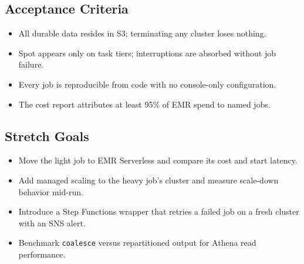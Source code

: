 \subsection*{Acceptance Criteria}
\begin{itemize}
    \item All durable data resides in S3; terminating any cluster loses nothing.
    \item Spot appears only on task tiers; interruptions are absorbed without job failure.
    \item Every job is reproducible from code with no console-only configuration.
    \item The cost report attributes at least 95\% of EMR spend to named jobs.
\end{itemize}

\subsection*{Stretch Goals}
\begin{itemize}
    \item Move the light job to EMR Serverless and compare its cost and start latency.
    \item Add managed scaling to the heavy job's cluster and measure scale-down behavior mid-run.
    \item Introduce a Step Functions wrapper that retries a failed job on a fresh cluster with an SNS alert.
    \item Benchmark \texttt{coalesce} versus repartitioned output for Athena read performance.
\end{itemize}
